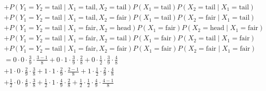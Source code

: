 \begin{solution}
\begin{enumerate}[label = (\alph*)]
\begin{align*}
        & +
        P(Y_1 = Y_2 = \mathrm{tail} \mid X_1 = \mathrm{tail}, X_2 = \mathrm{tail}) P(X_1 = \mathrm{tail}) P(X_2 = \mathrm{tail} \mid X_1 = \mathrm{tail}) \\
        & +
        P(Y_1 = Y_2 = \mathrm{tail} \mid X_1 = \mathrm{tail}, X_2 = \mathrm{fair}) P(X_1 = \mathrm{tail}) P(X_2 = \mathrm{fair} \mid X_1 = \mathrm{tail}) \\
        & +
        P(Y_1 = Y_2 = \mathrm{tail} \mid X_1 = \mathrm{fair}, X_2 = \mathrm{head}) P(X_1 = \mathrm{fair}) P(X_2 = \mathrm{head} \mid X_1 = \mathrm{fair}) \\
        & +
        P(Y_1 = Y_2 = \mathrm{tail} \mid X_1 = \mathrm{fair}, X_2 = \mathrm{tail}) P(X_1 = \mathrm{fair}) P(X_2 = \mathrm{tail} \mid X_1 = \mathrm{fair}) \\
        & +
        P(Y_1 = Y_2 = \mathrm{tail} \mid X_1 = \mathrm{fair}, X_2 = \mathrm{fair}) P(X_1 = \mathrm{fair}) P(X_2 = \mathrm{fair} \mid X_1 = \mathrm{fair}) \\
        & =
        0           \cdot 0           \cdot \frac{3}{9} \cdot \frac{3 - 1}{8}
        +
        0           \cdot 1           \cdot \frac{3}{9} \cdot \frac{2}{8}
        +
        0           \cdot \frac{1}{2} \cdot \frac{3}{9} \cdot \frac{4}{8} \\
        & +
        1           \cdot 0           \cdot \frac{2}{9} \cdot \frac{3}{8}
        +
        1           \cdot 1           \cdot \frac{2}{9} \cdot \frac{2 - 1}{8}
        +
        1           \cdot \frac{1}{2} \cdot \frac{2}{9} \cdot \frac{4}{8} \\
        & +
        \frac{1}{2} \cdot 0           \cdot \frac{4}{9} \cdot \frac{3}{8}
        +
        \frac{1}{2} \cdot 1           \cdot \frac{4}{9} \cdot \frac{2}{8}
        +
        \frac{1}{2} \cdot \frac{1}{2} \cdot \frac{4}{9} \cdot \frac{4 - 1}{8}
    \end{align*}

\end{enumerate}

\end{solution}

